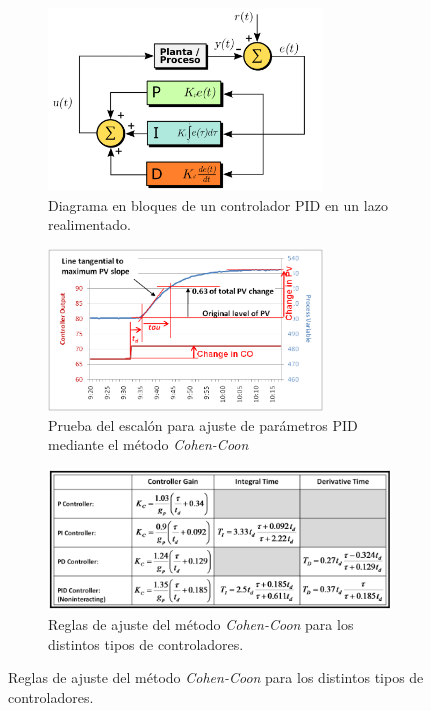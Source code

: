 \documentclass[a4paper,11pt]{article}
\begin{document}
\begin{figure}[!ht]
\begin{figure}[!ht]
\centering
\includegraphics[width=0.8\textwidth]{figs/PID_diagrama}
\caption{Diagrama en bloques de un controlador PID en un lazo realimentado.}
\label{fig:PID_diagrama}
\end{figure}

\begin{figure}[!ht]
\centering
\includegraphics[width=0.8\textwidth]{figs/CohenCoon_StepTest}
\caption{Prueba del escalón para ajuste de parámetros PID mediante el
\label{fig:CohenCoon_StepTest}
método \emph{Cohen-Coon}}
\end{figure}

\begin{figure}[!ht]
\centering
\includegraphics[width=\textwidth]{figs/CohenCoon_Rules}
\caption{Reglas de ajuste del método \emph{Cohen-Coon} para los
\label{fig:CohenCoon_Rules}
distintos tipos de controladores.}
\end{figure}


\end{figure}
\end{document}
